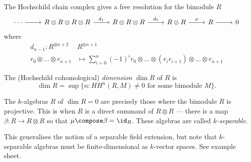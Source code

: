 \documentclass[a4paper]{article}
\begin{document}
\begin{definition}
  The Hochschild chain complex gives a free resolution for the bimodule \(R\)
  \[
    \begin{tikzcd}
      \cdots \ar[r] & R \otimes R \otimes R \otimes R \ar[r, "d_1"] & R \otimes R \otimes R \ar[r, "d_0"] & R \otimes R \ar[r, "\mu"] & R \ar[r] & 0
    \end{tikzcd}
  \]
  where
  \begin{align*}
    d_{n - 1}: R^{\otimes n + 2} & R^{\otimes n + 1} \\
    r_0 \otimes \dots \otimes r_{n + 1} &\mapsto \sum_{i = 0}^n (-1)^i r_0 \otimes \dots \otimes (r_ir_{i + 1}) \otimes \dots \otimes r_{n + 1}
  \end{align*}
\end{definition}

\begin{definition}
  The (Hochschild cohomological) \emph{dimension} \(\dim R\) of \(R\) is
  \[
    \dim R = \sup \{n: HH^n(R, M) \neq 0 \text{ for some bimodule } M\}.
  \]
\end{definition}

\begin{definition}[separable]
  The \(k\)-algebras \(R\) of \(\dim R = 0\) are precisely  those where the bimodule \(R\) is projective. This is when \(R\) is a direct summand of \(R \otimes R\) --- there is a map \(\beta: R \to R \otimes R\) so that \(\mu \compose \beta = \id_R\). These algebras are called \emph{\(k\)-separable}.
\end{definition}

This generalises the notion of a separable field extension, but note that \(k\)-separable algebras must be finite-dimensional as \(k\)-vector spaces. See example sheet.
\end{document}
